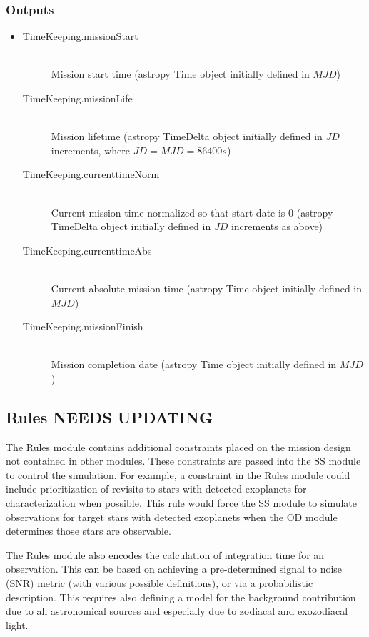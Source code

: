 \documentclass[cleanfoot]{asme2ej}
\begin{document}
\subsubsection*{Outputs}
\begin{itemize}
    \item
    \begin{description}
        \item[TimeKeeping.missionStart] \hfill \\
        Mission start time (astropy Time object initially defined in $ MJD $)
        \item[TimeKeeping.missionLife] \hfill \\
        Mission lifetime (astropy TimeDelta object initially defined in $ JD $ increments, where $ JD = MJD = 86400 s $)
        \item[TimeKeeping.currenttimeNorm] \hfill \\
        Current mission time normalized so that start date is 0 (astropy TimeDelta object initially defined in $ JD $ increments as above)
        \item[TimeKeeping.currenttimeAbs] \label{sec:currenttime}\hfill \\
        Current absolute mission time (astropy Time object initially defined in $ MJD $)
        \item[TimeKeeping.missionFinish] \hfill \\
        Mission completion date (astropy Time object initially defined in $ MJD $)

    \end{description}
\end{itemize}


\subsection{Rules NEEDS UPDATING}
The Rules module contains additional constraints placed on the mission design not contained in other modules. These constraints are passed into the SS module to control the simulation. For example, a constraint in the Rules module could include prioritization of revisits to stars with detected exoplanets for characterization when possible. This rule would force the SS module to simulate observations for target stars with detected exoplanets when the OD module determines those stars are observable.

The Rules module also encodes the calculation of integration time for an observation.  This can be based on achieving a pre-determined signal to noise (SNR) metric (with various possible definitions), or via a probabilistic description.  This requires also defining a model for the background contribution due to all astronomical sources and especially due to zodiacal and exozodiacal light.
\end{document}
